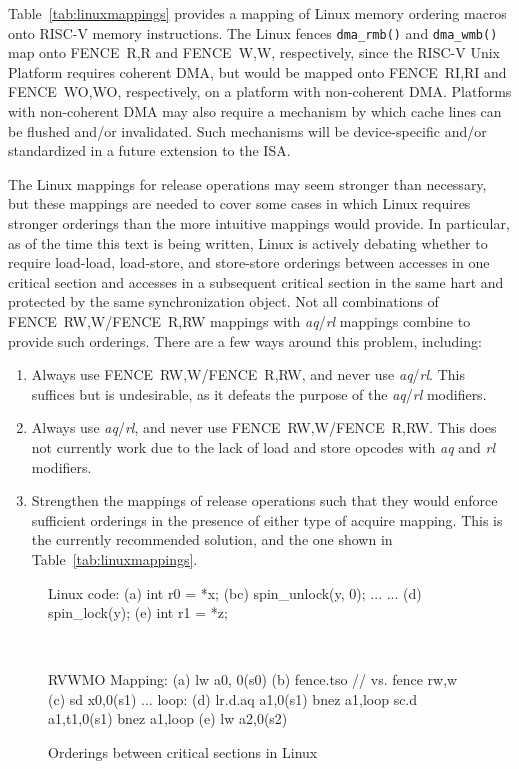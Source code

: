 Table~\ref{tab:linuxmappings} provides a mapping of Linux memory ordering macros onto RISC-V memory instructions.
The Linux fences {\tt dma\_rmb()} and {\tt dma\_wmb()} map onto FENCE~R,R and FENCE~W,W, respectively, since the RISC-V Unix Platform requires coherent DMA, but would be mapped onto FENCE~RI,RI and FENCE~WO,WO, respectively, on a platform with non-coherent DMA.
Platforms with non-coherent DMA may also require a mechanism by which cache lines can be flushed and/or invalidated.
Such mechanisms will be device-specific and/or standardized in a future extension to the ISA.

The Linux mappings for release operations may seem stronger than necessary, but these mappings are needed to cover some cases in which Linux requires stronger orderings than the more intuitive mappings would provide.
In particular, as of the time this text is being written, Linux is actively debating whether to require load-load, load-store, and store-store orderings between accesses in one critical section and accesses in a subsequent critical section in the same hart and protected by the same synchronization object.
Not all combinations of FENCE~RW,W/FENCE~R,RW mappings with {\em aq}/{\em rl} mappings combine to provide such orderings.
There are a few ways around this problem, including:
\begin{enumerate}
  \item Always use FENCE~RW,W/FENCE~R,RW, and never use {\em aq}/{\em rl}.  This suffices but is undesirable, as it defeats the purpose of the {\em aq}/{\em rl} modifiers.
  \item Always use {\em aq}/{\em rl}, and never use FENCE~RW,W/FENCE~R,RW.  This does not currently work due to the lack of load and store opcodes with {\em aq} and {\em rl} modifiers.
  \item Strengthen the mappings of release operations such that they would enforce sufficient orderings in the presence of either type of acquire mapping.  This is the currently recommended solution, and the one shown in Table~\ref{tab:linuxmappings}.
\end{enumerate}

\begin{figure}[h!]
  \centering\small
  \begin{verbbox}
Linux code:
(a)  int r0 = *x;
(bc) spin_unlock(y, 0);
     ...
     ...
(d)  spin_lock(y);
(e)  int r1 = *z;
  \end{verbbox}
  \theverbbox
  ~~~~~~~~~~
  \begin{verbbox}
RVWMO Mapping:
(a) lw           a0, 0(s0)
(b) fence.tso  // vs. fence rw,w
(c) sd           x0,0(s1)
    ...
    loop:
(d) lr.d.aq a1,0(s1)
    bnez         a1,loop
    sc.d a1,t1,0(s1)
    bnez         a1,loop
(e) lw           a2,0(s2)
  \end{verbbox}
  \theverbbox
  \caption{Orderings between critical sections in Linux}
  \label{fig:litmus:lkmm_ll}
\end{figure}

